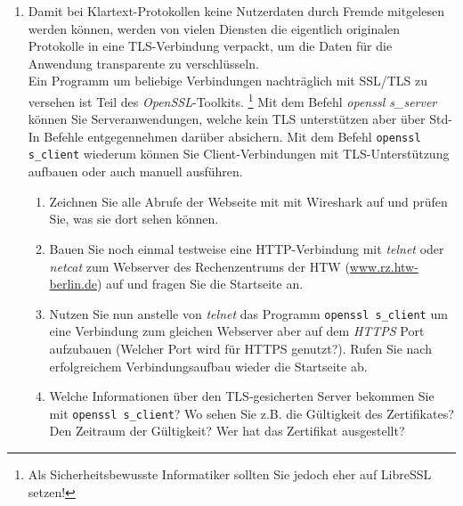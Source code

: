 \documentclass[paper=a4,fontsize=11pt]{scrartcl}%
\numberwithin{equation}{section}
\begin{document}
\begin{enumerate}
\begin{enumerate}
	\end{enumerate}
	\item Damit bei Klartext-Protokollen keine Nutzerdaten durch Fremde mitgelesen werden können, werden von vielen Diensten die eigentlich originalen Protokolle in eine TLS-Verbindung verpackt, um die Daten für die Anwendung transparente zu verschlüsseln.\\
Ein Programm um beliebige Verbindungen nachträglich mit SSL/TLS zu versehen ist Teil des \emph{OpenSSL}-Toolkits. \footnote{Als Sicherheitsbewusste Informatiker sollten Sie jedoch eher auf LibreSSL setzen!} Mit dem Befehl \emph{openssl s\_server} können Sie Serveranwendungen, welche kein TLS unterstützen aber über Std-In Befehle entgegennehmen darüber absichern. Mit dem Befehl \texttt{openssl s\_client} wiederum können Sie Client-Verbindungen mit TLS-Unterstützung aufbauen oder auch manuell ausführen.
	\begin{enumerate}
		\item Zeichnen Sie alle Abrufe der Webseite mit mit Wireshark auf und prüfen Sie, was sie dort sehen können.
		\item Bauen Sie noch einmal testweise eine HTTP-Verbindung mit \emph{telnet} oder \emph{netcat} zum Webserver des Rechenzentrums der HTW (\url{www.rz.htw-berlin.de}) auf und fragen Sie die Startseite an.
 		\item Nutzen Sie nun anstelle von \emph{telnet} das Programm \texttt{openssl s\_client} um eine Verbindung zum gleichen Webserver aber auf dem \emph{HTTPS} Port aufzubauen (Welcher Port wird für HTTPS genutzt?). Rufen Sie nach erfolgreichem Verbindungsaufbau wieder die Startseite ab.
 		\item Welche Informationen über den TLS-gesicherten Server bekommen Sie mit \texttt{openssl s\_client}? Wo sehen Sie z.B. die Gültigkeit des Zertifikates? Den Zeitraum der Gültigkeit? Wer hat das Zertifikat ausgestellt?
	\end{enumerate}
\end{enumerate}
\end{document}
